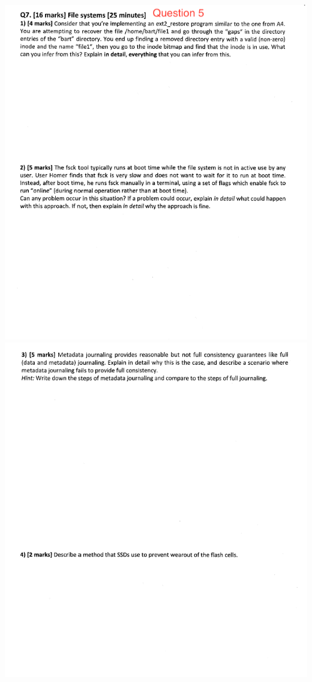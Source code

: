 \documentclass[12pt]{article}
\begin{document}
\begin{center}
\includegraphics[width=\linewidth]{../images/midterm_4_7.png}
\includegraphics[width=\linewidth]{../images/midterm_4_8.png}

\end{center}
\end{document}
